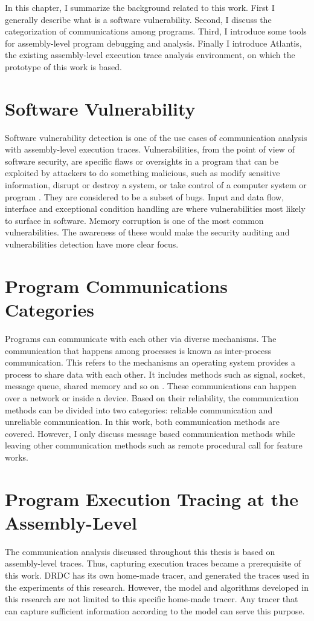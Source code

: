 \label{chapter:Bac}
In this chapter, I summarize the background related to this work. First I generally describe what is a software vulnerability. Second, I discuss the categorization of communications among programs. Third, I introduce some tools for assembly-level program debugging and analysis. Finally I introduce Atlantis, the existing assembly-level execution trace analysis environment, on which the prototype of this work is based.

\section{Software Vulnerability}
Software vulnerability detection is one of the use cases of communication analysis with assembly-level execution traces. Vulnerabilities, from the point of view of software security, are specific flaws or oversights in a program that can be exploited by attackers to do something malicious, such as modify sensitive information, disrupt or destroy a system, or take control of a computer system or program \cite{dowd_art_2006}. They are considered to be a subset of bugs. Input and data flow, interface and exceptional condition handling are where vulnerabilities most likely to surface in software. Memory corruption is one of the most common vulnerabilities. The awareness of these would make the security auditing and vulnerabilities detection have more clear focus. 

\section{Program Communications Categories}
Programs can communicate with each other via diverse mechanisms. The communication that happens among processes is known as inter-process communication. This refers to the mechanisms an operating system provides a process to share data with each other. It includes methods such as signal, socket, message queue, shared memory and so on \cite{garrido2000inter}. These communications can happen over a network or inside a device. Based on their reliability, the communication methods can be divided into two categories: reliable communication and unreliable communication. In this work, both communication methods are covered. However, I only discuss message based communication methods while leaving other communication methods such as remote procedural call for feature works.

\section{Program Execution Tracing at the Assembly-Level}
The communication analysis discussed throughout this thesis is based on assembly-level traces. Thus, capturing execution traces became a prerequisite of this work. DRDC has its own home-made tracer, and generated the traces used in the experiments of this research. However, the model and algorithms developed in this research are not limited to this specific home-made tracer. Any tracer that can capture sufficient information according to the model can serve this purpose.

